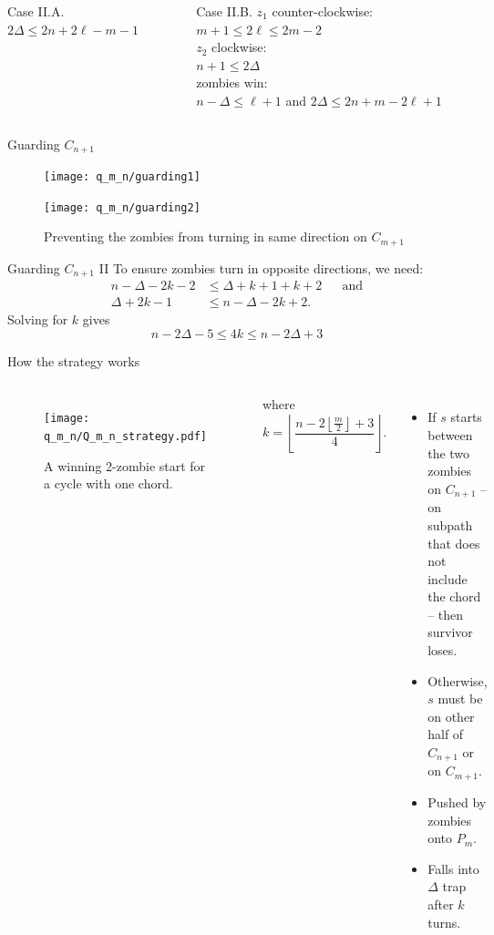 \begin{frame}
\begin{columns}[T]
\begin{block}{Case II.A.}
$2 \Delta \leq 2n + 2\ell - m - 1$ \\
\end{block}
\vfill
\begin{block}{Case II.B.}
$z_1$ counter-clockwise: $ m + 1 \leq 2 \ell \leq 2m - 2$ \\
$z_2$ clockwise: \\
$ n+1 \leq 2 \Delta $ \\
zombies win: \\
$ n - \Delta \leq \ell + 1$ and $2 \Delta \leq 2n + m - 2\ell + 1$ \\
\end{block}
\end{columns}
\end{frame}

\begin{frame}{Guarding $C_{n+1}$}
  \begin{figure}
    \centering
    \texttt{[image: q\_m\_n/guarding1]}

    \vspace{1cm}

    \texttt{[image: q\_m\_n/guarding2]}
    \caption{Preventing the zombies from turning in same direction on $C_{m+1}$\label{fig:guarding}}
  \end{figure}
\end{frame}

\begin{frame}{Guarding $C_{n+1}$ II}
To ensure zombies turn in opposite directions, we need:
  \begin{align*}
   n - \Delta - 2k - 2 &\leq \Delta + k +1 + k +2 && \text{and} \\
   \Delta + 2k -1 &\leq n - \Delta -2k +2 .
  \end{align*}
  Solving for $k$ gives
  \[ n - 2\Delta -5 \leq 4k \leq n - 2\Delta +3 \]
\end{frame}

\begin{frame}{How the strategy works}
  \begin{columns}
    \begin{figure}
    \texttt{[image: q\_m\_n/Q\_m\_n\_strategy.pdf]}
    \caption{A winning 2-zombie start for a cycle with one chord.}
    \end{figure}
    where
    \[ k = \left\lfloor \frac{n - 2 \left\lfloor\frac{m}{2}\right\rfloor +3}{4} \right\rfloor. \]

    \begin{itemize}
      \item<1-> If $s$ starts between the two zombies on $C_{n+1}$ -- on subpath that does not include the chord -- then survivor loses.
      \item<2-> Otherwise, $s$ must be on other half of $C_{n+1}$ or on $C_{m+1}$.
      \item<3-> Pushed by zombies onto $P_m$.
      \item<4-> Falls into $\Delta$ trap after $k$ turns.
    \end{itemize}
  \end{columns}
\end{frame}
